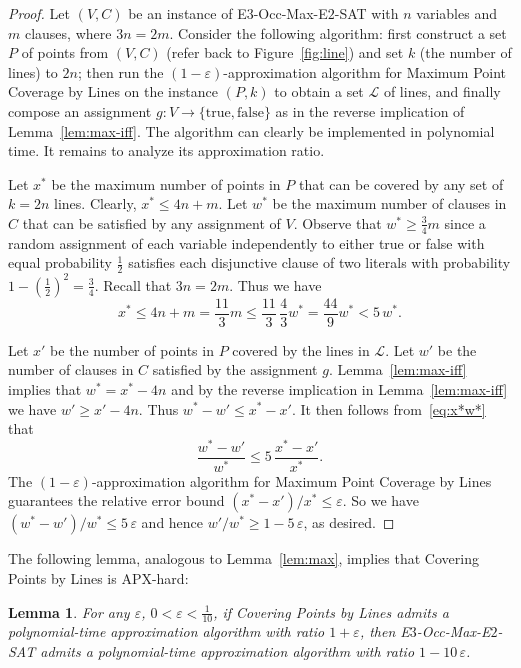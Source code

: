 \documentclass[letterpaper,11pt]{article}
\newtheorem{lemma}{Lemma}
\def\L{{\mathcal L}}
\newcommand{\eps}{\varepsilon}
\begin{document}
\begin{proof}
Let $(V,C)$ be an instance of {\sc E$3$-Occ-Max-E$2$-SAT} with $n$ variables
and $m$ clauses, where $3n = 2m$.
Consider the following algorithm:
first construct a set $P$ of points from $(V,C)$ 
(refer back to Figure~\ref{fig:line}) and set
$k$ (the number of lines) to $2n$; 
then run the $(1-\eps)$-approximation algorithm for
{\sc Maximum Point Coverage by Lines}
on the instance $(P,k)$ to obtain a set $\L$ of lines,
and finally compose an assignment
$g:V \to \{\textrm{true}, \textrm{false}\}$
as in the reverse implication of Lemma~\ref{lem:max-iff}.
The algorithm can clearly be implemented in polynomial time.
It remains to analyze its approximation ratio.

Let $x^*$ be the maximum number of points in $P$
that can be covered by any set of $k = 2n$ lines.
Clearly, $x^* \le 4n + m$.
Let $w^*$ be the maximum number of clauses in $C$ that can be satisfied by
any assignment of $V$.
Observe that $w^* \ge \frac34 m$
since a random assignment of each variable independently to either true
or false with equal probability $\frac12$ satisfies each disjunctive clause
of two literals with probability $1 - (\frac12)^2 = \frac34$.
Recall that $3n = 2m$.
Thus we have
\begin{equation}\label{eq:x*w*}
x^* \le 4n + m = \frac{11}3 m \le \frac{11}3\,\frac43 w^* = \frac{44}9 w^*
< 5\,w^*.
\end{equation}

Let $x'$ be the number of points in $P$ covered by the lines in $\L$.
Let $w'$ be the number of clauses in $C$ satisfied by the assignment $g$.
Lemma~\ref{lem:max-iff} implies that
$w^* = x^* - 4n$
and by the reverse implication in Lemma~\ref{lem:max-iff} we have 
$w' \ge x' - 4n$.
Thus
$w^* - w' \le x^* - x'$.
It then follows from~\eqref{eq:x*w*} that
$$
\frac{w^* - w'}{w^*}
\le 5\,\frac{x^* - x'}{x^*}.
$$
The $(1-\eps)$-approximation algorithm for {\sc Maximum Point Coverage by Lines}
guarantees the relative error bound
$(x^* - x')/x^* \le \eps$.
So we have
$(w^* - w')/w^* \le 5\,\eps$
and hence $w'/w^* \ge 1 - 5\,\eps$, as desired.
\end{proof}

The following lemma, analogous to Lemma~\ref{lem:max},
implies that {\sc Covering Points by Lines} is APX-hard:

\begin{lemma}\label{lem:min}
For any $\eps$, $0 < \eps < \frac1{10}$,
if {\sc Covering Points by Lines} admits a polynomial-time approximation algorithm
with ratio $1 + \eps$,
then {\sc E$3$-Occ-Max-E$2$-SAT} admits a polynomial-time approximation algorithm
with ratio $1 - 10\,\eps$.
\end{lemma}
\end{document}

